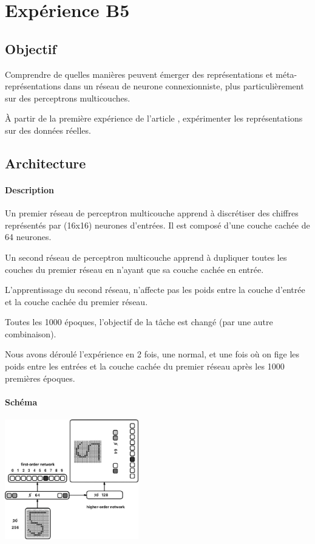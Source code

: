 \section{Expérience B5} \label{expB5}
  \subsection{Objectif}
    Comprendre de quelles manières peuvent émerger des représentations et méta-représentations dans 
    un réseau de neurone connexionniste, plus particulièrement sur des perceptrons multicouches.
    
    
    À partir de la première expérience de l'article \cite{Cleeremans_2007}, expérimenter les représentations
    sur des données réelles.
  
  \subsection{Architecture}
    \paragraph{Description}
      Un premier réseau de perceptron multicouche apprend à discrétiser des chiffres représentés
      par (16x16) neurones d'entrées. Il est composé d'une couche cachée de 64 neurones.
      
      Un second réseau de perceptron multicouche apprend à dupliquer toutes les couches du premier
      réseau en n'ayant que sa couche cachée en entrée.
      
      L'apprentissage du second réseau, n'affecte pas les poids entre la couche d'entrée et la 
      couche cachée du premier réseau.
      
      Toutes les 1000 époques, l'objectif de la tâche est changé (par une autre combinaison).
      
      Nous avons déroulé l'expérience en 2 fois, une normal, et une fois où on fige les poids
      entre les entrées et la couche cachée du premier réseau après les 1000 premières époques.
    \paragraph{Schéma}
      \begin{center}
	\includegraphics[width=220px]{data/expA3/schema.png}
      \end{center}
      
